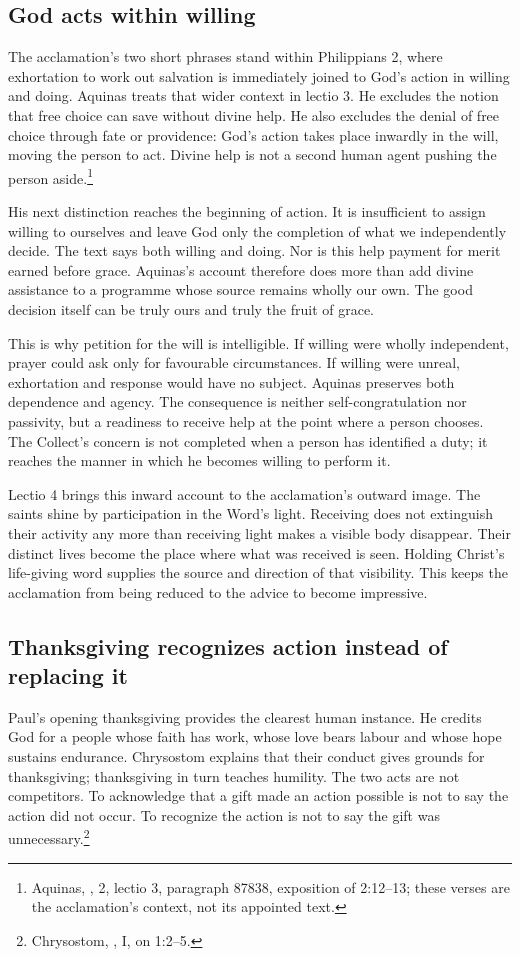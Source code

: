 \subsection{God acts within willing}
The acclamation's two short phrases stand within Philippians 2, where exhortation to work out salvation is immediately joined to God's action in willing and doing. Aquinas treats that wider context in lectio 3. He excludes the notion that free choice can save without divine help. He also excludes the denial of free choice through fate or providence: God's action takes place inwardly in the will, moving the person to act. Divine help is not a second human agent pushing the person aside.\footnote{Aquinas, , 2, lectio 3, paragraph 87838, exposition of 2:12--13; these verses are the acclamation's context, not its appointed text.}

His next distinction reaches the beginning of action. It is insufficient to assign willing to ourselves and leave God only the completion of what we independently decide. The text says both willing and doing. Nor is this help payment for merit earned before grace. Aquinas's account therefore does more than add divine assistance to a programme whose source remains wholly our own. The good decision itself can be truly ours and truly the fruit of grace.

This is why petition for the will is intelligible. If willing were wholly independent, prayer could ask only for favourable circumstances. If willing were unreal, exhortation and response would have no subject. Aquinas preserves both dependence and agency. The consequence is neither self-congratulation nor passivity, but a readiness to receive help at the point where a person chooses. The Collect's concern is not completed when a person has identified a duty; it reaches the manner in which he becomes willing to perform it.

Lectio 4 brings this inward account to the acclamation's outward image. The saints shine by participation in the Word's light. Receiving does not extinguish their activity any more than receiving light makes a visible body disappear. Their distinct lives become the place where what was received is seen. Holding Christ's life-giving word supplies the source and direction of that visibility. This keeps the acclamation from being reduced to the advice to become impressive.

\subsection{Thanksgiving recognizes action instead of replacing it}
Paul's opening thanksgiving provides the clearest human instance. He credits God for a people whose faith has work, whose love bears labour and whose hope sustains endurance. Chrysostom explains that their conduct gives grounds for thanksgiving; thanksgiving in turn teaches humility. The two acts are not competitors. To acknowledge that a gift made an action possible is not to say the action did not occur. To recognize the action is not to say the gift was unnecessary.\footnote{Chrysostom, , I, on 1:2--5.}

